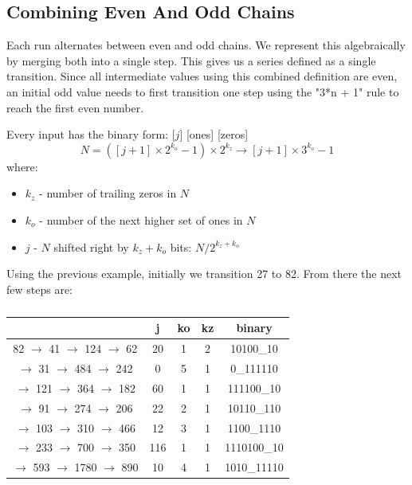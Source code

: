 \documentclass[letterpaper]{article}
\begin{document}
\begin{multicols}{2}
    \subsection{Combining Even And Odd Chains}

    Each run alternates between even and odd chains. We represent this algebraically by merging both into a single step. This gives us a series defined as a single transition. Since all intermediate values using this combined definition are even, an initial odd value needs to first transition one step using the "3*n + 1" rule to reach the first even number.

    Every input has the binary form: [$j$] [ones] [zeros]
    \[
        N = ([j + 1] \times 2^{k_o} - 1) \times 2^{k_z} \rightarrow [j + 1] \times 3^{k_o} - 1
    \]
    where:
    \begin{itemize}
        \item $k_z$ - number of trailing zeros in $N$
        \item $k_o$ - number of the next higher set of ones in $N$
        \item $j$ - $N$ shifted right by $k_z + k_o$ bits: $N / 2^{k_z + k_o}$
    \end{itemize}

    Using the previous example, initially we transition 27 to 82. From there the next few steps are:

    \begin{table}[ht]
        \centering
        \begin{tabular}{|c|c|c|c|c|}
            \hline
                                             & \textbf{j} & \textbf{ko} & \textbf{kz} & \textbf{binary} \\
            \hline
            82 $\to$ 41  $\to$  124 $\to$ 62 & 20         & 1           & 2           & 10100\_10       \\
            \hline
            $\to$ 31  $\to$  484 $\to$ 242   & 0          & 5           & 1           & 0\_111110       \\
            \hline
            $\to$ 121 $\to$  364 $\to$ 182   & 60         & 1           & 1           & 111100\_10      \\
            \hline
            $\to$  91 $\to$  274 $\to$ 206   & 22         & 2           & 1           & 10110\_110      \\
            \hline
            $\to$ 103 $\to$  310 $\to$ 466   & 12         & 3           & 1           & 1100\_1110      \\
            \hline
            $\to$ 233 $\to$  700 $\to$ 350   & 116        & 1           & 1           & 1110100\_10     \\
            \hline
            $\to$ 593 $\to$ 1780 $\to$ 890   & 10         & 4           & 1           & 1010\_11110     \\
            \hline
        \end{tabular}
        \caption{}
    \end{table}


\end{multicols}
\end{document}
